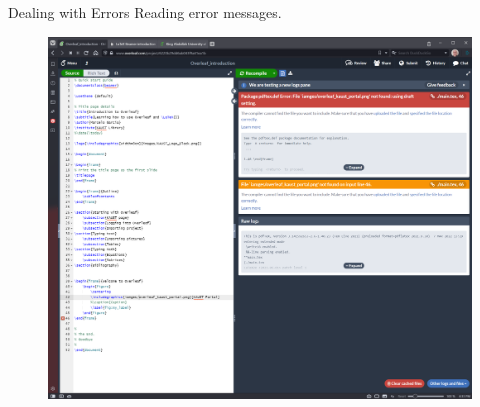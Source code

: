 \documentclass[aspectratio=169]{beamer}
\begin{document}
\begin{frame}{Dealing with Errors}
    Reading error messages.
    \begin{figure}
        \centering
        \includegraphics[scale=0.18]{images/overleaf_compilation_error.png}
        \label{fig:compile_error}
    \end{figure}
\end{frame}

% 
%
\end{document}
